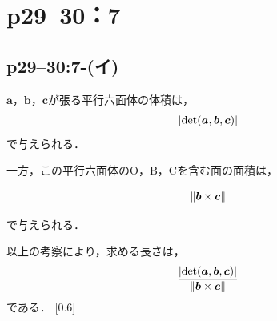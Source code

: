 \documentclass[a4paper,10pt,fleqn]{ltjsarticle}
\begin{document}
\newpage

\section*{p29--30：7}

\subsection*{p29--30:7-(イ)}

\begin{tleftbar}
  $\bm{a}$，$\bm{b}$，$\bm{c}$が張る平行六面体の体積は，
  \[
    \abs{\det (\bm{a},\bm{b},\bm{c})}
  \]
  で与えられる．

  一方，この平行六面体の$\mathrm{O}$，$\mathrm{B}$，$\mathrm{C}$を含む面の面積は，

  \[
    \norm{\bm{b} \times \bm{c}}
  \]

  で与えられる．

  以上の考察により，求める長さは，
  \[
    \frac{\abs{\det(\bm{a},\bm{b},\bm{c})}}{\norm{\bm{b} \times \bm{c}}}
  \]
  である．
  \scalebox{0.6}[0.6]{
    \begin{tikzpicture}[x=0.75pt,y=0.75pt,yscale=-1,xscale=1]


\end{tikzpicture}}
\end{tleftbar}
\end{document}
